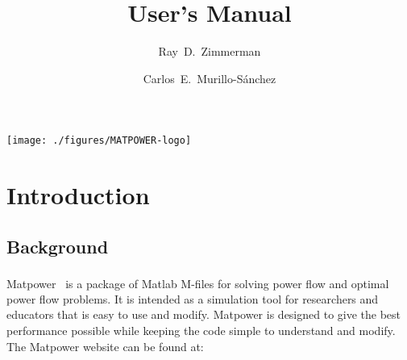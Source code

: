 \documentclass[12pt]{article}
\title{User's Manual}
\author{Ray~D.~Zimmerman \and Carlos~E.~Murillo-S\'anchez}
\newcommand{\mpver}[0]{7.0.1-dev}
\newcommand{\matlab}[0]{{\sc Matlab}}
\newcommand{\matpower}[0]{{\sc Matpower}}
\newcommand{\pserc}[0]{{\sc PSerc}}
\newcommand{\PSERC}[0]{{Power Systems Engineering Research Center (\pserc{})}}
\numberwithin{equation}{section}
\numberwithin{table}{section}
\numberwithin{figure}{section}
\begin{document}
\makeatletter
\makeatother
\thispagestyle{empty}
\newpage

\thispagestyle{empty}
\newpage

\setcounter{page}{1} %

\clearpage
\tableofcontents
\clearpage
\listoffigures
\listoftables

\clearpage
\begin{center}
\noindent\texttt{[image: ./figures/MATPOWER-logo]}
\end{center}
\section{Introduction}

\subsection{Background}

\matpower{}~\cite{zimmerman2011,matpower} is a package of \matlab{}\textsuperscript{\tiny \textregistered} M-files for solving power flow and optimal power flow problems. It is intended as a simulation tool for researchers and educators that is easy to use and modify. \matpower{} is designed to give the best performance possible while keeping the code simple to understand and modify. The \matpower{} website can be found at:
\end{document}
